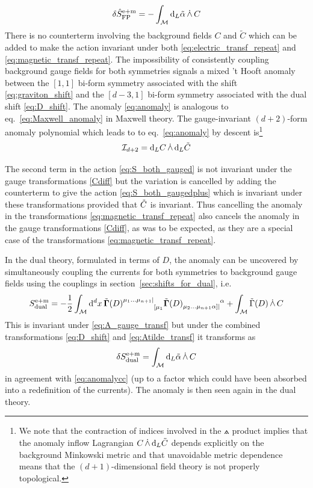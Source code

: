 \begin{equation}\label{eq:anomalycc}
    \delta \hat S_{\text{FP}}^{\text{e}+\text{m}} = -\int_{\mathcal{M}} \dd_L \tilde\alpha \,\dot{\wedge}\, {C}
\end{equation}
There is no counterterm involving the background fields $C$ and $\tilde{C}$ which can be added to make the action invariant under both \eqref{eq:electric_transf_repeat} and \eqref{eq:magnetic_transf_repeat}.
The impossibility of consistently coupling background gauge fields for both symmetries signals a mixed 't Hooft anomaly between the $[1,1]$ bi-form symmetry associated with the shift \eqref{eq:graviton_shift} and the $[d-3,1]$ bi-form symmetry associated with the dual shift \eqref{eq:D_shift}.
The anomaly \eqref{eq:anomaly} is analogous to eq.~\eqref{eq:Maxwell_anomaly} in Maxwell theory. The gauge-invariant $(d+2)$-form anomaly polynomial which leads to to eq.~\eqref{eq:anomaly} by descent is\footnote{We note that the contraction of indices involved in the $\wedgedot$ product implies that the anomaly inflow Lagrangian $C \,\dot{\wedge}\, \dd_L \tilde{C}$ depends explicitly on the background Minkowski metric and that unavoidable metric dependence means that the $(d+1)$-dimensional field theory is not properly topological.} 
\begin{equation}\label{eq:anomaly_poly}
    \mathcal{I}_{d+2} = \dd_L C \,\dot{\wedge}\, \dd_L \tilde{C}
\end{equation}

The second term in the action \eqref{eq:S_both_gauged} is not invariant under the gauge transformations \eqref{Cdiff} but the variation is cancelled by adding the counterterm to give the action \eqref{eq:S_both_gaugedplus} which is invariant under these transformations provided that $\tilde{C}$ is invariant.
Thus cancelling the anomaly in the transformations \eqref{eq:magnetic_transf_repeat} also cancels the anomaly in the gauge transformations \eqref{Cdiff}, as was to be expected, as they are a special case of the transformations \eqref{eq:magnetic_transf_repeat}.

In the dual theory, formulated in terms of $D$, the anomaly can be uncovered by simultaneously coupling the currents for both symmetries to background gauge fields using the couplings in section~\ref{sec:shifts_for_dual}, i.e.
\begin{equation}
    S_{\text{dual}}^{\text{e}+\text{m}} = -\frac{1}{2} \int_{\mathcal{M}} \dd[d]{x} \tilde{\ggamma}(D)\indices{^{\mu_1\dots\mu_{n+1}|}_{[\mu_1}} \tilde{\ggamma}(D)\indices{_{\mu_2\dots\mu_{n+1}\alpha]|}^\alpha} + \int_{\mathcal{M}} \tilde{\Gamma}(D) \,\wedgedot\, \gaugefield
\end{equation}
This is invariant under \eqref{eq:A_gauge_transf} but under the combined transformations \eqref{eq:D_shift} and \eqref{eq:Atilde_transf} it transforms as
\begin{equation}\label{eq:anomalyd}
    \delta S_{\text{dual}}^{\text{e}+\text{m}} = \int_{\mathcal{M}} \dd_L \tilde\alpha \,\dot{\wedge}\, {C}
\end{equation}
in agreement with \eqref{eq:anomalycc} (up to a factor which could have been absorbed into a redefinition of the currents). The anomaly is then seen again in the dual theory.
